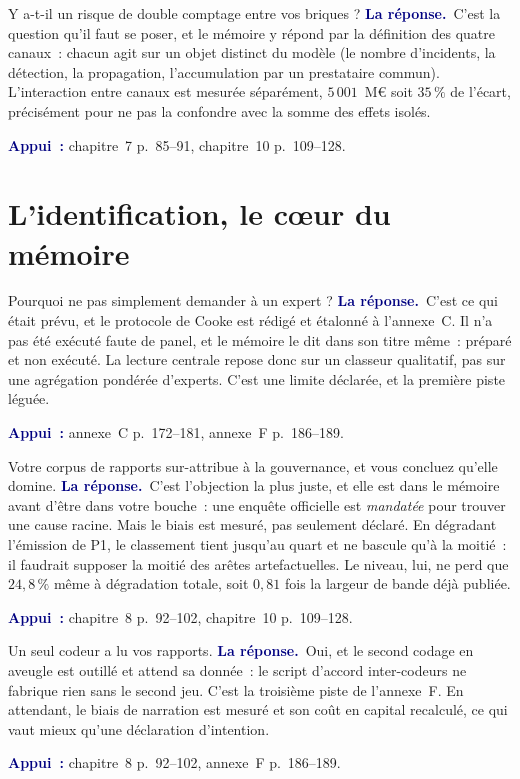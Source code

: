 \documentclass[11pt,a4paper]{article}
\newcommand{\rep}[1]{\smallskip\noindent\textcolor{navy}{\textbf{La réponse.}}\ #1\par}
\newcommand{\appui}[1]{\smallskip\noindent\small\textcolor{navy}{\textbf{Appui~:}} #1\par\normalsize}
\begin{document}
\begin{question}{\og Y a-t-il un risque de double comptage entre vos briques ?\fg{}}
\rep{C'est la question qu'il faut se poser, et le mémoire y répond par la définition des quatre
canaux~: chacun agit sur un objet distinct du modèle (le nombre d'incidents, la détection, la
propagation, l'accumulation par un prestataire commun). L'interaction entre canaux est mesurée
séparément, $5\,001$~M\euro{} soit $35\,\%$ de l'écart, précisément pour ne pas la confondre avec
la somme des effets isolés.}
\appui{chapitre~7 p.~85--91, chapitre~10 p.~109--128.}
\end{question}

\section{L'identification, le c\oe ur du mémoire}

\begin{question}{\og Pourquoi ne pas simplement demander à un expert ?\fg{}}
\rep{C'est ce qui était prévu, et le protocole de Cooke est rédigé et étalonné à l'annexe~C. Il
n'a pas été exécuté faute de panel, et le mémoire le dit dans son titre même~: \og préparé et non
exécuté\fg{}. La lecture centrale repose donc sur un classeur qualitatif, pas sur une agrégation
pondérée d'experts. C'est une limite déclarée, et la première piste léguée.}
\appui{annexe~C p.~172--181, annexe~F p.~186--189.}
\end{question}

\begin{question}{\og Votre corpus de rapports sur-attribue à la gouvernance, et vous concluez qu'elle domine.\fg{}}
\rep{C'est l'objection la plus juste, et elle est dans le mémoire avant d'être dans votre bouche~:
une enquête officielle est \emph{mandatée} pour trouver une cause racine. Mais le biais est
mesuré, pas seulement déclaré. En dégradant l'émission de P1, le classement tient jusqu'au quart
et ne bascule qu'à la moitié~: il faudrait supposer la moitié des arêtes artefactuelles. Le
niveau, lui, ne perd que $24{,}8\,\%$ même à dégradation totale, soit $0{,}81$ fois la largeur de
bande déjà publiée.}
\appui{chapitre~8 p.~92--102, chapitre~10 p.~109--128.}
\end{question}

\begin{question}{\og Un seul codeur a lu vos rapports.\fg{}}
\rep{Oui, et le second codage en aveugle est outillé et attend sa donnée~: le script d'accord
inter-codeurs ne fabrique rien sans le second jeu. C'est la troisième piste de l'annexe~F. En
attendant, le biais de narration est mesuré et son coût en capital recalculé, ce qui vaut mieux
qu'une déclaration d'intention.}
\appui{chapitre~8 p.~92--102, annexe~F p.~186--189.}
\end{question}
\end{document}
